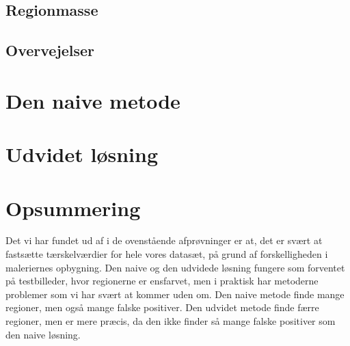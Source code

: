 {\subsection{Regionmasse}


\subsection{Overvejelser}


\section{Den naive metode}

\clearpage

\section{Udvidet løsning}

\clearpage

\section{Opsummering}
Det vi har fundet ud af i de ovenstående afprøvninger er at, det er
svært at fastsætte tærskelværdier for hele vores datasæt, på
grund af forskelligheden i maleriernes opbygning. Den naive og den
udvidede løsning fungere som forventet på testbilleder,
hvor regionerne er ensfarvet, men i praktisk har metoderne problemer som
vi har svært at kommer uden om. Den naive metode finde mange regioner,
men også mange falske positiver. Den udvidet metode finde færre
regioner, men er mere præcis, da den ikke finder så mange falske
positiver som den naive løsning.

}

